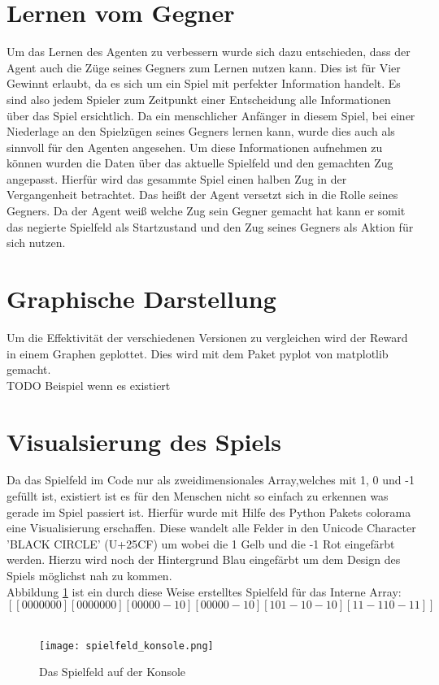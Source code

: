 \section{Lernen vom Gegner}
Um das Lernen des Agenten zu verbessern wurde sich dazu entschieden, dass der Agent auch die Züge seines Gegners zum Lernen nutzen kann. Dies ist für Vier Gewinnt erlaubt, da es sich um ein Spiel mit perfekter Information handelt. Es sind also jedem Spieler zum Zeitpunkt einer Entscheidung alle Informationen über das Spiel ersichtlich. Da ein menschlicher Anfänger in diesem Spiel, bei einer Niederlage an den Spielzügen seines Gegners lernen kann, wurde dies auch als sinnvoll für den Agenten angesehen. Um diese Informationen aufnehmen zu können wurden die Daten über das aktuelle Spielfeld und den gemachten Zug angepasst. Hierfür wird das gesammte Spiel einen halben Zug in der Vergangenheit betrachtet. Das heißt der Agent versetzt sich in die Rolle seines Gegners. Da der Agent weiß welche Zug sein Gegner gemacht hat kann er somit das negierte Spielfeld als Startzustand und den Zug seines Gegners als Aktion für sich nutzen. 

\section{Graphische Darstellung}
Um die Effektivität der verschiedenen Versionen zu vergleichen wird der Reward in einem Graphen geplottet. Dies wird mit dem Paket pyplot von matplotlib gemacht.\\
\colorbox{red!30}{TODO Beispiel wenn es existiert}

\section{Visualsierung des Spiels}
\label{sec:visualisierung}
Da das Spielfeld im Code nur als zweidimensionales Array,welches mit 1, 0 und -1 gefüllt ist, existiert ist es für den Menschen nicht so einfach zu erkennen was gerade im Spiel passiert ist. Hierfür wurde mit Hilfe des Python Pakets colorama eine Visualisierung erschaffen. Diese wandelt alle Felder in den Unicode Character 'BLACK CIRCLE' (U+25CF) um wobei die 1 Gelb und die -1 Rot eingefärbt werden. Hierzu wird noch der Hintergrund Blau eingefärbt um dem Design des Spiels möglichst nah zu kommen. \\
Abbildung \ref{fig:spielfeld_konsole} ist ein durch diese Weise erstelltes Spielfeld für das Interne Array:
$$[[ 0  0  0  0  0  0  0]
 [ 0  0  0  0  0  0  0]
 [ 0  0  0  0  0 -1  0]
 [ 0  0  0  0  0 -1  0]
 [ 1  0  1 -1  0 -1  0]
 [ 1  1 -1  1  0 -1  1]]$$\\

\begin{figure}[h!]
  \texttt{[image: spielfeld\_konsole.png]}
  \centering
  \caption{Das Spielfeld auf der Konsole}
  \label{fig:spielfeld_konsole}
\end{figure}
